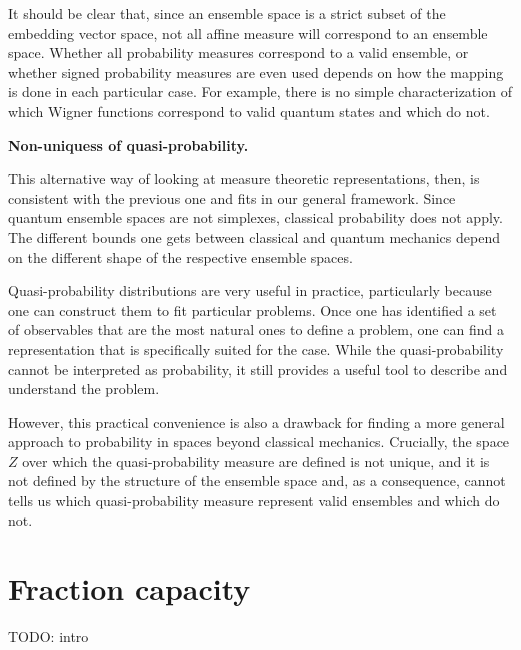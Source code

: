\documentclass[10pt,twocolumn, nofootinbib]{revtex4-2}
\begin{document}
It should be clear that, since an ensemble space is a strict subset of the embedding vector space, not all affine measure will correspond to an ensemble space. Whether all probability measures correspond to a valid ensemble, or whether signed probability measures are even used depends on how the mapping is done in each particular case. For example, there is no simple characterization of which Wigner functions correspond to valid quantum states and which do not.


\textbf{Non-uniquess of quasi-probability.} 

This alternative way of looking at measure theoretic representations, then, is consistent with the previous one and fits in our general framework. Since quantum ensemble spaces are not simplexes, classical probability does not apply. The different bounds one gets between classical and quantum mechanics depend on the different shape of the respective ensemble spaces.

Quasi-probability distributions are very useful in practice, particularly because one can construct them to fit particular problems. Once one has identified a set of observables that are the most natural ones to define a problem, one can find a representation that is specifically suited for the case. While the quasi-probability cannot be interpreted as probability, it still provides a useful tool to describe and understand the problem.

However, this practical convenience is also a drawback for finding a more general approach to probability in spaces beyond classical mechanics. Crucially, the space $Z$ over which the quasi-probability measure are defined is not unique, and it is not defined by the structure of the ensemble space and, as a consequence, cannot tells us which quasi-probability measure represent valid ensembles and which do not.

\section{Fraction capacity}

TODO: intro
\end{document}
